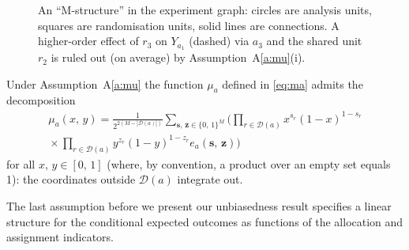 \documentclass[sigconf]{acmart}
\newcounter{assumption}
\newcommand{\nn}{\nonumber}
\begin{document}
\begin{figure}
\centering
{}
\caption{An ``M-structure'' in the experiment graph: circles are analysis units, squares are randomisation units, solid lines are connections. A higher-order effect of $r_3$ on $Y_{a_1}$ (dashed) via $a_3$ and the shared unit $r_2$ is ruled out (on average) by Assumption~A\ref{a:mu}(i).}
\label{fig:m-structure}
\end{figure}

Under Assumption~A\ref{a:mu} the function $\mu_a$ defined in \eqref{eq:ma} admits the decomposition
\begin{eqnarray}\label{eq:mu-decomp}
    \mu_a(x,\,y) = \frac 1 {2^{2(M-|\mathcal D(a)|)}}\sum_{\textbf{s},\,\textbf{z}\in\{0,\,1\}^M} \Bigg( \prod_{r\in \mathcal{D}(a)} x^{s_r}(1-x)^{1-s_r} \nn\\{}\times \prod_{r\in \mathcal{D}(a)}
    y^{z_r}(1-y)^{1-z_r}e_a(\textbf{s},\,\textbf{z})\Bigg)
\end{eqnarray}
for all $x,\,y\in[0,\,1]$ (where, by convention, a product over an empty set equals 1): the coordinates outside $\mathcal D(a)$ integrate out.

The last assumption before we present our unbiasedness result specifies a linear structure for the conditional expected outcomes as functions of the allocation and assignment indicators.
\end{document}
